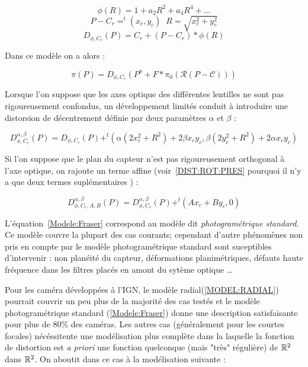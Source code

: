 \begin{equation}
   \phi(R) =   1 + a_2 R^2 + a_4 R^4 +\dots
\end{equation}
\begin{equation}
      P-C_r= ^t(x_c,y_c) \; \; R=\sqrt{x_c^2+y_c^2}
\end{equation}
\begin{equation}
   D_{\phi,C_r}(P) =   C_r + (P-C_r) *  \phi(R) 
   \label{MODEL:RADIAL}
\end{equation}

Dans ce mod\`ele on a alors :

\begin{equation}
   \pi(P) =   D_{\phi,C_r}(P^p+F*\pi_0(\mathcal{R}(P-\mathcal{C})))
\end{equation}


Lorsque l'on suppose que  les axes optique des diff\'erentes lentilles
ne sont pas rigoureusement confondus, un d\'eveloppement limit\'es
conduit \`a introduire  une distorsion de
d\'ecentrement d\'efinie par deux param\`etres $\alpha$ et $\beta$ :


\begin{equation}
   D_{\phi,C_r}^{\alpha,\beta}(P) =    D_{\phi,C_r}(P)
       + ^t(\alpha(2 x_c^2 + R^2)+2\beta x_c y_c ,\beta(2y_c^2+R^2) + 2\alpha x_c y_c)
   \label{MODEL:DECENTRE}
\end{equation}

Si l'on suppose que le plan du capteur n'est pas rigoureusement orthogonal
\`a  l'axe optique, on rajoute un terme affine (voir~\ref{DIST:ROT:PRES}
pourquoi il n'y a que deux termes supl\'ementaires ) :

\begin{equation}
   D_{\phi,C_r,A,B}^{\alpha,\beta}(P) =   
   D_{\phi,C_r}^{\alpha,\beta}(P) + ^t(A x_c+B y_c,0)  
   \label{Modele:Fraser}
\end{equation}

L'\'equation~\ref{Modele:Fraser} correspond au mod\`ele dit 
\emph{photogram\'etrique standard}. Ce mod\`ele couvre la plupart
des cas courants; cependant d'autre ph\'enom\`enes non pris
en compte par le mod\`ele photogram\'etrique standard  sont suceptibles d'intervenir :
non plan\'eit\'e du capteur, d\'eformations planim\'etriques,
d\'efauts haute fr\'equence dans les filtres plac\'es
en amont du syt\`eme optique \dots 

Pour les cam\'era d\'evelopp\'ees \`a l'IGN, 
le mod\`ele radial(\ref{MODEL:RADIAL}) pourrait couvrir
un peu plus de la  majorit\'e des cas test\'es et 
le mod\`ele photogram\'etrique standard
(\ref{Modele:Fraser}) donne une description satisfaisante pour plus de $80\%$
des cam\'eras.  Les autres cas (g\'en\'eralement pour les courtes focales)
n\'ec\'essitente une mod\'elisation plus compl\`ete dans la laquelle
la fonction de distortion est \emph{a priori} une fonction quelconque 
(mais "tr\`es" r\'eguli\`ere) de $\RR^2$ dans $\RR^2$. On aboutit
dans ce cas \`a la mod\'elisation suivante :

